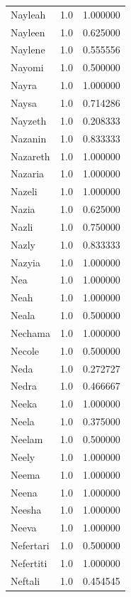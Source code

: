\documentclass[
  letterpaper,
  DIV=11,
  numbers=noendperiod]{scrreprt}
\begin{document}
\begin{tabular}{lrr}
Nayleah         &   1.0 &   1.000000 \\
Nayleen         &   1.0 &   0.625000 \\
Naylene         &   1.0 &   0.555556 \\
Nayomi          &   1.0 &   0.500000 \\
Nayra           &   1.0 &   1.000000 \\
Naysa           &   1.0 &   0.714286 \\
Nayzeth         &   1.0 &   0.208333 \\
Nazanin         &   1.0 &   0.833333 \\
Nazareth        &   1.0 &   1.000000 \\
Nazaria         &   1.0 &   1.000000 \\
Nazeli          &   1.0 &   1.000000 \\
Nazia           &   1.0 &   0.625000 \\
Nazli           &   1.0 &   0.750000 \\
Nazly           &   1.0 &   0.833333 \\
Nazyia          &   1.0 &   1.000000 \\
Nea             &   1.0 &   1.000000 \\
Neah            &   1.0 &   1.000000 \\
Neala           &   1.0 &   0.500000 \\
Nechama         &   1.0 &   1.000000 \\
Necole          &   1.0 &   0.500000 \\
Neda            &   1.0 &   0.272727 \\
Nedra           &   1.0 &   0.466667 \\
Neeka           &   1.0 &   1.000000 \\
Neela           &   1.0 &   0.375000 \\
Neelam          &   1.0 &   0.500000 \\
Neely           &   1.0 &   1.000000 \\
Neema           &   1.0 &   1.000000 \\
Neena           &   1.0 &   1.000000 \\
Neesha          &   1.0 &   1.000000 \\
Neeva           &   1.0 &   1.000000 \\
Nefertari       &   1.0 &   0.500000 \\
Nefertiti       &   1.0 &   1.000000 \\
Neftali         &   1.0 &   0.454545 \\

\end{tabular}
\end{document}
